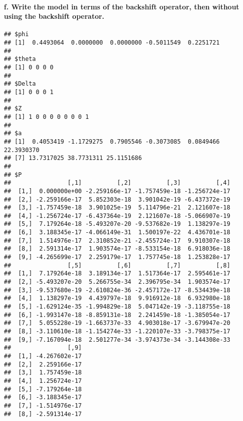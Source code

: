 \documentclass[]{article}
\newenvironment{Shaded}{\begin{snugshade}}{\end{snugshade}}
\newcommand{\OperatorTok}[1]{\textcolor[rgb]{0.81,0.36,0.00}{\textbf{#1}}}
\newcommand{\NormalTok}[1]{#1}
\let\oldparagraph\paragraph
\renewcommand{\paragraph}[1]{\oldparagraph{#1}\mbox{}}
\begin{document}
\paragraph{f. Write the model in terms of the backshift operator, then
without using the backshift
operator.}\label{f.-write-the-model-in-terms-of-the-backshift-operator-then-without-using-the-backshift-operator.}

\begin{Shaded}
\end{Shaded}

\begin{verbatim}
## $phi
## [1]  0.4493064  0.0000000  0.0000000 -0.5011549  0.2251721
## 
## $theta
## [1] 0 0 0 0
## 
## $Delta
## [1] 0 0 0 1
## 
## $Z
## [1] 1 0 0 0 0 0 0 0 1
## 
## $a
## [1]  0.4053419 -1.1729275  0.7905546 -0.3073085  0.0849466 22.3930370
## [7] 13.7317025 38.7731311 25.1151686
## 
## $P
##                [,1]          [,2]          [,3]          [,4]
##  [1,]  0.000000e+00 -2.259166e-17 -1.757459e-18 -1.256724e-17
##  [2,] -2.259166e-17  5.852303e-18  3.901042e-19 -6.437372e-19
##  [3,] -1.757459e-18  3.901025e-19  5.114796e-21  2.121607e-18
##  [4,] -1.256724e-17 -6.437364e-19  2.121607e-18 -5.066907e-19
##  [5,]  7.179264e-18 -5.493207e-20 -9.537682e-19  1.138297e-19
##  [6,]  3.188345e-17 -4.066149e-31  1.500197e-22  4.436701e-18
##  [7,]  1.514976e-17  2.310852e-21 -2.455724e-17  9.910307e-18
##  [8,]  2.591314e-17  1.903574e-17 -8.533154e-18  6.918036e-18
##  [9,] -4.265699e-17  2.259179e-17  1.757745e-18  1.253828e-17
##                [,5]          [,6]          [,7]          [,8]
##  [1,]  7.179264e-18  3.189134e-17  1.517364e-17  2.595461e-17
##  [2,] -5.493207e-20  5.266755e-34  2.396795e-34  1.903574e-17
##  [3,] -9.537680e-19 -2.610824e-36 -2.457172e-17 -8.534439e-18
##  [4,]  1.138297e-19  4.439797e-18  9.916912e-18  6.932980e-18
##  [5,] -1.629124e-35 -1.994829e-18  5.047142e-19 -3.118755e-18
##  [6,] -1.993147e-18 -8.859131e-18  2.241459e-18 -1.385054e-17
##  [7,]  5.055228e-19 -1.663737e-33  4.903018e-17 -3.679947e-20
##  [8,] -3.110610e-18 -1.154274e-33 -1.220107e-33 -3.798375e-17
##  [9,] -7.167094e-18  2.501277e-34 -3.974373e-34 -3.144308e-33
##                [,9]
##  [1,] -4.267602e-17
##  [2,]  2.259166e-17
##  [3,]  1.757459e-18
##  [4,]  1.256724e-17
##  [5,] -7.179264e-18
##  [6,] -3.188345e-17
##  [7,] -1.514976e-17
##  [8,] -2.591314e-17

\end{verbatim}
\end{document}

